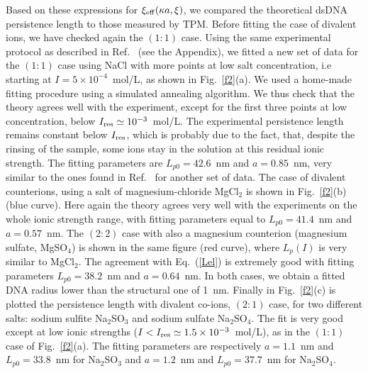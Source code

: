 \documentclass[aps,pre,twocolumn]{revtex4}
\def\eq#1{Eq.~(\ref{#1})}
\def\fig#1{Fig.~\ref{#1}}
\begin{document}
Based on these expressions for  $\xi_{\rm eff}(\kappa a,\xi)$, we compared the theoretical dsDNA persistence length to those measured by TPM. Before fitting the case of divalent ions, we have checked again the $(1:1)$ case.
Using the same experimental protocol as described in Ref.~\cite{PRL2019} (see the Appendix), we fitted a new set of data for the $(1:1)$ case using NaCl with more points at low salt concentration, i.e starting at $I=5\times 10^{-4}$~mol/L, as shown in \fig{f2}(a).
We used a home-made fitting procedure using a simulated annealing algorithm.
We thus check that the theory agrees well with the experiment, except for the first three points at low concentration, below $I_{\rm res}\simeq 10^{-3}$~mol/L. The experimental persistence length remains constant below $I_{\rm res}$, which is probably due to the fact, that, despite the rinsing of the sample, some ions stay in the solution at this residual ionic strength. The fitting parameters are $L_{p0}=42.6$~nm and $a=0.85$~nm, very similar to the ones found in Ref.~\cite{PRL2019} for another set of data.
The case of divalent counterions, using a salt of magnesium-chloride MgCl$_2$ %
is shown in \fig{f2}(b) (blue curve). Here again the theory agrees very well with the experiments on the whole ionic strength range, with fitting parameters equal to $L_{p0}=41.4$~nm and $a=0.57$~nm. The $(2:2)$ case with also a magnesium counterion (magnesium sulfate, MgSO$_4$) %
is shown in the same figure (red curve), where $L_p(I)$ is very similar to MgCl$_2$. The agreement with \eq{Lel} is extremely good with fitting parameters $L_{p0}=38.2$~nm and $a=0.64$~nm. In both cases, we obtain a fitted DNA radius lower than the structural one of 1~nm.
Finally in \fig{f2}(c) is plotted the persistence length with divalent co-ions, $(2:1)$ case, for two different salts: sodium sulfite Na$_2$SO$_3$ %
and sodium sulfate Na$_2$SO$_4$. %
The fit is very good except at low ionic strengths ($I<I_{\rm res}\simeq 1.5\times10^{-3}$~mol/L), as in the $(1:1)$ case of \fig{f2}(a). The fitting parameters are respectively $a=1.1$~nm and  $L_{p0}=33.8$~nm for Na$_2$SO$_3$ and $a=1.2$~nm and $L_{p0}=37.7$~nm for Na$_2$SO$_4$.

\end{document}
